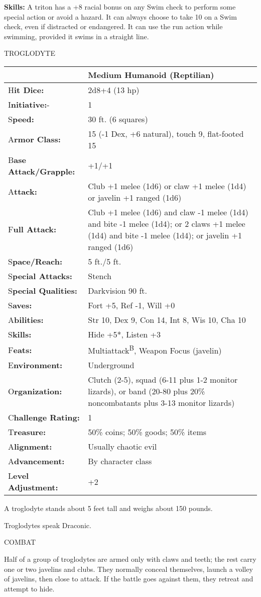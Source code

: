 \documentclass{article}
\begin{document}
\textbf{Skills:} A triton has a +8 racial bonus on any Swim check to perform some 
special action or avoid a hazard. It can always choose to take 10 on a Swim check, 
even if distracted or endangered. It can use the run action while swimming, provided 
it swims in a straight line.

\vspace{12pt}
{\LARGE{}TROGLODYTE}

\begin{tabular}{|>{\raggedright}p{91pt}|>{\raggedright}p{203pt}|}
\hline
  & Medium Humanoid (Reptilian)\tabularnewline
\hline
H\textbf{it Dice:} & 2d8+4 (13 hp)\tabularnewline
\hline
I\textbf{nitiative:}- & 1\tabularnewline
\hline
S\textbf{peed:} & 30 ft. (6 squares)\tabularnewline
\hline
A\textbf{rmor Class:} & 15 (-1 Dex, +6 natural), touch 9, flat-footed 15\tabularnewline
\hline
B\textbf{ase Attack/Grapple:} & +1/+1\tabularnewline
\hline
A\textbf{ttack:} & Club +1 melee (1d6) or claw +1 melee (1d4) or javelin +1 ranged 
(1d6)\tabularnewline
\hline
F\textbf{ull Attack:} & Club +1 melee (1d6) and claw -1 melee (1d4) and bite -1 
melee (1d4); or 2 claws +1 melee (1d4) and bite -1 melee (1d4); or javelin +1 ranged 
(1d6)\tabularnewline
\hline
S\textbf{pace/Reach:} & 5 ft./5 ft.\tabularnewline
\hline
S\textbf{pecial Attacks:} & Stench\tabularnewline
\hline
S\textbf{pecial Qualities:} & Darkvision 90 ft.\tabularnewline
\hline
S\textbf{aves:} & Fort +5, Ref -1, Will +0\tabularnewline
\hline
A\textbf{bilities:} & Str 10, Dex 9, Con 14, Int 8, Wis 10, Cha 10\tabularnewline
\hline
S\textbf{kills:} & Hide +5*, Listen +3\tabularnewline
\hline
F\textbf{eats:} & Multiattack\textsuperscript{B}, Weapon Focus (javelin)\tabularnewline
\hline
E\textbf{nvironment:} & Underground\tabularnewline
\hline
O\textbf{rganization:} & Clutch (2-5), squad (6-11 plus 1-2 monitor lizards), or 
band (20-80 plus 20\% noncombatants plus 3-13 monitor lizards)\tabularnewline
\hline
C\textbf{hallenge Rating:} & 1\tabularnewline
\hline
T\textbf{reasure:} & 50\% coins; 50\% goods; 50\% items\tabularnewline
\hline
A\textbf{lignment:} & Usually chaotic evil\tabularnewline
\hline
A\textbf{dvancement:} & By character class\tabularnewline
\hline
L\textbf{evel Adjustment:} & +2\tabularnewline
\hline
\end{tabular}

A troglodyte stands about 5 feet tall and weighs about 150 pounds.

Troglodytes speak Draconic.

COMBAT

Half of a group of troglodytes are armed only with claws and teeth; the rest carry 
one or two javelins and clubs. They normally conceal themselves, launch a volley 
of javelins, then close to attack. If the battle goes against them, they retreat 
and attempt to hide.
\end{document}
